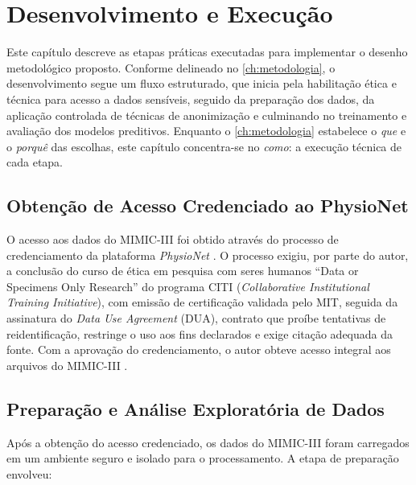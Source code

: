\chapter{Desenvolvimento e Execução}
\label{ch:desenvolvimento}

Este capítulo descreve as etapas práticas executadas para implementar o desenho metodológico proposto. Conforme delineado no \autoref{ch:metodologia}, o desenvolvimento segue um fluxo estruturado, que inicia pela habilitação ética e técnica para acesso a dados sensíveis, seguido da preparação dos dados, da aplicação controlada de técnicas de anonimização e culminando no treinamento e avaliação dos modelos preditivos. Enquanto o \autoref{ch:metodologia} estabelece o \textit{que} e o \textit{porquê} das escolhas, este capítulo concentra-se no \textit{como}: a execução técnica de cada etapa.

\section{Obtenção de Acesso Credenciado ao PhysioNet}
\label{sec:dev-physionet}

O acesso aos dados do MIMIC-III foi obtido através do processo de credenciamento da plataforma \textit{PhysioNet} \cite{Goldberger2000}. O processo exigiu, por parte do autor, a conclusão do curso de ética em pesquisa com seres humanos ``Data or Specimens Only Research'' do programa CITI (\textit{Collaborative Institutional Training Initiative}), com emissão de certificação validada pelo MIT, seguida da assinatura do \textit{Data Use Agreement} (DUA), contrato que proíbe tentativas de reidentificação, restringe o uso aos fins declarados e exige citação adequada da fonte. Com a aprovação do credenciamento, o autor obteve acesso integral aos arquivos do MIMIC-III \cite{Johnson2016}.

\section{Preparação e Análise Exploratória de Dados}
\label{sec:dev-preparacao}

Após a obtenção do acesso credenciado, os dados do MIMIC-III foram carregados em um ambiente seguro e isolado para o processamento. A etapa de preparação envolveu:


